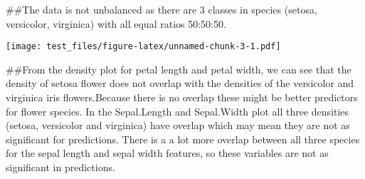 \documentclass[
]{article}
\newenvironment{Shaded}{\begin{snugshade}}{\end{snugshade}}
\newcommand{\AttributeTok}[1]{\textcolor[rgb]{0.77,0.63,0.00}{#1}}
\newcommand{\CommentTok}[1]{\textcolor[rgb]{0.56,0.35,0.01}{\textit{#1}}}
\newcommand{\DecValTok}[1]{\textcolor[rgb]{0.00,0.00,0.81}{#1}}
\newcommand{\FloatTok}[1]{\textcolor[rgb]{0.00,0.00,0.81}{#1}}
\newcommand{\FunctionTok}[1]{\textcolor[rgb]{0.00,0.00,0.00}{#1}}
\newcommand{\NormalTok}[1]{#1}
\newcommand{\OtherTok}[1]{\textcolor[rgb]{0.56,0.35,0.01}{#1}}
\newcommand{\SpecialCharTok}[1]{\textcolor[rgb]{0.00,0.00,0.00}{#1}}
\newcommand{\StringTok}[1]{\textcolor[rgb]{0.31,0.60,0.02}{#1}}
\begin{document}
\#\#The data is not unbalanced as there are 3 classes in species
(setosa, versicolor, virginica) with all equal ratios 50:50:50.

\begin{Shaded}
\end{Shaded}

\texttt{[image: test\_files/figure-latex/unnamed-chunk-3-1.pdf]}

\#\#From the density plot for petal length and petal width, we can see
that the density of setosa flower does not overlap with the densities of
the versicolor and virginica iris flowers.Because there is no overlap
these might be better predictors for flower species. In the Sepal.Length
and Sepal.Width plot all three densities (setosa, versicolor and
virginica) have overlap which may mean they are not as significant for
predictions. There is a a lot more overlap between all three species for
the sepal length and sepal width features, so these variables are not as
significant in predictions.
\end{document}

